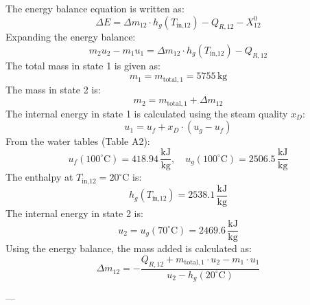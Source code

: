 The energy balance equation is written as:  
\[
\Delta E = \Delta m_{12} \cdot h_g(T_{\text{in,12}}) - Q_{R,12} - X_{12}^0
\]  
Expanding the energy balance:  
\[
m_2 u_2 - m_1 u_1 = \Delta m_{12} \cdot h_g(T_{\text{in,12}}) - Q_{R,12}
\]  
The total mass in state 1 is given as:  
\[
m_1 = m_{\text{total},1} = 5755 \, \text{kg}
\]  
The mass in state 2 is:  
\[
m_2 = m_{\text{total},1} + \Delta m_{12}
\]  
The internal energy in state 1 is calculated using the steam quality \( x_D \):  
\[
u_1 = u_f + x_D \cdot (u_g - u_f)
\]  
From the water tables (Table A2):  
\[
u_f(100^\circ\text{C}) = 418.94 \, \frac{\text{kJ}}{\text{kg}}, \quad u_g(100^\circ\text{C}) = 2506.5 \, \frac{\text{kJ}}{\text{kg}}
\]  
The enthalpy at \( T_{\text{in,12}} = 20^\circ\text{C} \) is:  
\[
h_g(T_{\text{in,12}}) = 2538.1 \, \frac{\text{kJ}}{\text{kg}}
\]  
The internal energy in state 2 is:  
\[
u_2 = u_g(70^\circ\text{C}) = 2469.6 \, \frac{\text{kJ}}{\text{kg}}
\]  
Using the energy balance, the mass added is calculated as:  
\[
\Delta m_{12} = -\frac{Q_{R,12} + m_{\text{total},1} \cdot u_2 - m_1 \cdot u_1}{u_2 - h_g(20^\circ\text{C})}
\]  

---